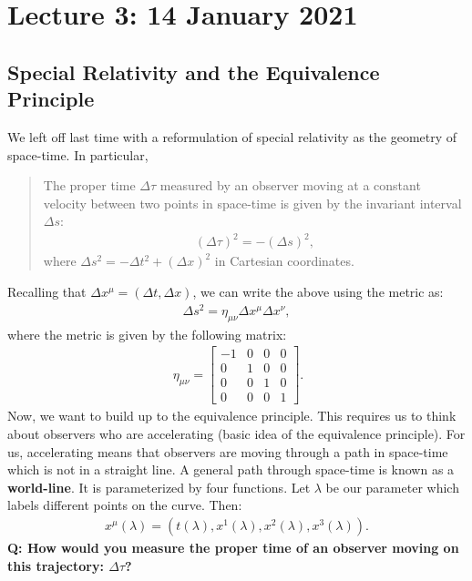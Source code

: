 \documentclass[11pt]{article}
\theoremstyle{definition}
\begin{document}
\section{Lecture 3: 14 January 2021}
\subsection{Special Relativity and the Equivalence Principle}
We left off last time with a reformulation of special relativity as the geometry of space-time. In particular, 
\begin{quote}
	The proper time \( \Delta \tau \) measured by an observer moving at a constant velocity between two points in space-time is given by the invariant interval \( \Delta s \): 
	\begin{align*}
		(\Delta \tau)^2 = - (\Delta s)^2, 
	\end{align*}
	where \( \Delta s^2 = - \Delta t^2 + (\Delta x)^2 \) in Cartesian coordinates. 
\end{quote}
Recalling that \( \Delta x^\mu = (\Delta t, \Delta x) \), we can write the above using the metric as: 
\begin{align*}
	\Delta s^2 = \eta_{\mu \nu} \Delta x^\mu \Delta x^\nu, 
\end{align*}
where the metric is given by the following matrix:
\begin{align*}
	\ \eta_{\mu \nu} = \begin{bmatrix}
		-1 & 0 & 0 & 0 \\
		0 & 1 & 0 & 0 \\
		0 & 0 & 1 & 0 \\
		0 & 0 & 0 & 1 
	\end{bmatrix}. 
\end{align*}
Now, we want to build up to the equivalence principle. This requires us to think about observers who are accelerating (basic idea of the equivalence principle). For us, accelerating means that observers are moving through a path in space-time which is not in a straight line. 
\newline
\newline
A general path through space-time is known as a \textbf{world-line}. It is parameterized by four functions. Let \( \lambda \) be our parameter which labels different points on the curve. Then:
\begin{align*}
	x^\mu(\lambda) = (t (\lambda), x^1(\lambda), x^2 (\lambda), x^3 (\lambda)). 
\end{align*}
\textbf{Q: How would you measure the proper time of an observer moving on this trajectory: \( \Delta \tau \)?}
\end{document}
